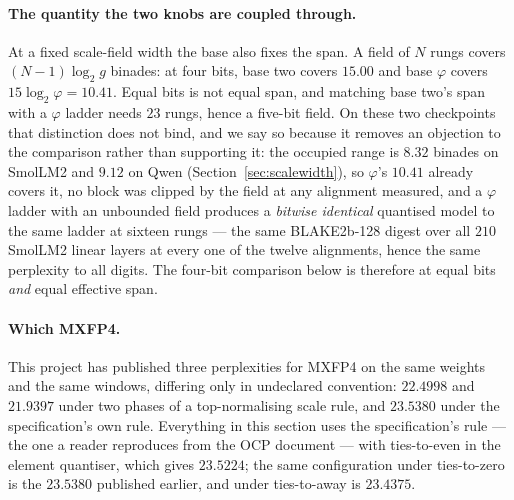 \documentclass[11pt]{article}
\theoremstyle{definition}
\begin{document}
\paragraph{The quantity the two knobs are coupled through.}
At a fixed scale-field width the base also fixes the span. A field of $N$ rungs
covers $(N-1)\log_2 g$ binades: at four bits, base two covers $15.00$ and base
$\varphi$ covers $15\log_2\varphi = 10.41$. Equal bits is not equal span, and
matching base two's span with a $\varphi$ ladder needs $23$ rungs, hence a
five-bit field.%
On these two checkpoints that distinction does not bind, and we say so because
it removes an objection to the comparison rather than supporting it: the
occupied range is $8.32$ binades on SmolLM2 and $9.12$ on Qwen
(Section~\ref{sec:scalewidth}), so $\varphi$'s $10.41$ already covers it, no block
was clipped by the field at any alignment measured, and a $\varphi$ ladder with
an unbounded field produces a \emph{bitwise identical} quantised model to the
same ladder at sixteen rungs --- the same BLAKE2b-128 digest over all $210$
SmolLM2 linear layers at every one of the twelve alignments, hence the same
perplexity to all digits. The four-bit comparison below is therefore at equal
bits \emph{and} equal effective span.

\paragraph{Which MXFP4.} This project has published three perplexities for
MXFP4 on the same weights and the same windows, differing only in undeclared
convention: $22.4998$ and $21.9397$ under two phases of a top-normalising scale
rule, and $23.5380$ under the specification's own rule. Everything in this
section uses the specification's rule --- the one a reader reproduces from the
OCP document --- with ties-to-even in the element quantiser, which gives
$23.5224$; the same configuration under ties-to-zero is the $23.5380$ published
earlier, and under ties-to-away is $23.4375$.
\end{document}
